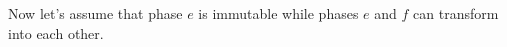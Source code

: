 Now let's assume that phase \(e\) is immutable while phases \(e\) and \(f\) can transform into each other.